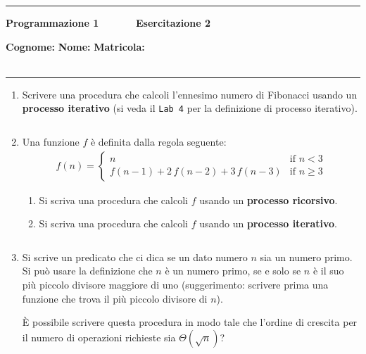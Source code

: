 \documentclass[11pt,a4]{article}
\newcommand{\mybox}[2]{$\quad$\fbox{
\begin{minipage}{#1cm}
\hfill\vspace{#2cm}
\end{minipage}
}}
\begin{document}
\thispagestyle{empty}
\hrule
\begin{center}
   {\Large {\bf Programmazione 1 \hspace{3cm} $\quad \quad \quad$ Esercitazione 2}}
\end{center}
{\bf Cognome: }\hspace{2.5cm} {\bf Nome: } \hspace{2.5cm} {\bf Matricola: } \\\
\hrule

\begin{enumerate}
\section*{}

\item Scrivere una procedura che calcoli l'ennesimo numero di Fibonacci usando un {\bf processo iterativo}
(si veda il {\tt Lab 4} per la definizione di processo iterativo).

\mybox{15}{3.5}

\item Una funzione $f$ è definita dalla regola seguente:
\begin{align}
	f(n) = \left\{\begin{array}{ll} n & \mbox{if } n<3 \\ f(n-1)+2\,f(n-2)+3\,f(n-3) & \mbox{if } n \geq 3 \end{array} \right.
\end{align}
\begin{enumerate}
\item Si scriva una procedura che calcoli $f$ usando un {\bf processo ricorsivo}.
\item Si scriva una procedura che calcoli $f$ usando un {\bf processo iterativo}.
\end{enumerate}

\mybox{15}{3.5}

\item Si scrive un predicato che ci dica se un dato numero $n$ sia un numero primo.
Si può usare la definizione che $n$ è un numero primo, se e solo se $n$ è il suo più piccolo divisore maggiore di uno
(suggerimento: scrivere prima una funzione che trova il più piccolo divisore di $n$).

È possibile scrivere questa procedura in modo tale che l'ordine di crescita per il numero di operazioni richieste sia $\Theta(\sqrt{n})$?


\end{enumerate}
\end{document}

